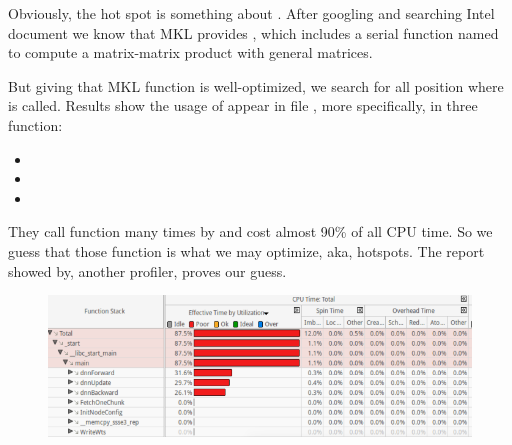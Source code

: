 \documentclass{article}
\begin{document}
Obviously, the hot spot is something about . After googling
and searching Intel document we know that MKL provides , which includes a serial function named 
to compute a matrix-matrix product with general matrices.%

But giving that MKL function is well-optimized, we search for all position where  is called. Results show the usage of  appear in file , more specifically, in three function:%

\begin{itemize}[noitemsep,topsep=\mdcompacttopsep]%

\item{}%

\item{}%

\item{}%
\end{itemize}%

\noindent{}They call  function  many times by  and 
cost almost 90\% of all CPU time. So we guess that those function
 is what we may optimize, aka, hotspots.
The report showed by, another profiler, proves our guess.%

\begin{figure}[tbp]%
\begin{mdcenter}%

\noindent{}\includegraphics[keepaspectratio=true,width=\dimmin{}{\dimwidth{0.90}}]{images/2016-02-19-10-36-25-}{}%

\mdhr{}%

\noindent{}%
\end{mdcenter}\label{fig-myfigure}%
\end{figure}%
\end{document}

